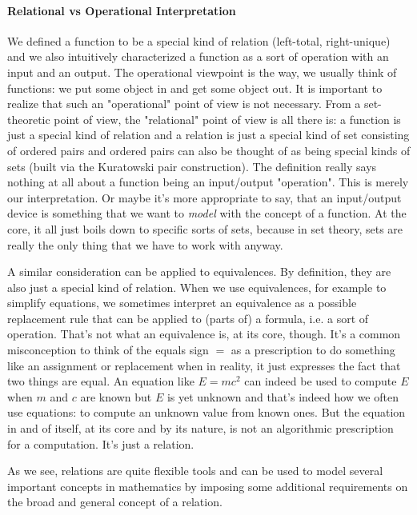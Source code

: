 \paragraph{Relational vs Operational Interpretation}
We defined a function to be a special kind of relation (left-total, right-unique) and we also intuitively characterized a function as a sort of operation with an input and an output. The operational viewpoint is the way, we usually think of functions: we put some object in and get some object out. It is important to realize that such an "operational" point of view is not necessary. From a set-theoretic point of view, the "relational" point of view is all there is: a function is just a special kind of relation and a relation is just a special kind of set consisting of ordered pairs and ordered pairs can also be thought of as being special kinds of sets (built via the Kuratowski pair construction). The definition really says nothing at all about a function being an input/output "operation". This is merely our interpretation. Or maybe it's more appropriate to say, that an input/output device is something that we want to \emph{model} with the concept of a function. At the core, it all just boils down to specific sorts of sets, because in set theory, sets are really the only thing that we have to work with anyway.

\medskip
A similar consideration can be applied to equivalences. By definition, they are also just a special kind of relation. When we use equivalences, for example to simplify equations, we sometimes interpret an equivalence as a possible replacement rule that can be applied to (parts of) a formula, i.e. a sort of operation. That's not what an equivalence is, at its core, though. It's a common misconception to think of the equals sign $=$ as a prescription to do something like an assignment or replacement when in reality, it just expresses the fact that two things are equal. An equation like $E = m c^2$ can indeed be used to compute $E$ when $m$ and $c$ are known but $E$ is yet unknown and that's indeed how we often use equations: to compute an unknown value from known ones. But the equation in and of itself, at its core and by its nature, is not an algorithmic prescription for a computation. It's just a relation.

\medskip
As we see, relations are quite flexible tools and can be used to model several important concepts in mathematics by imposing some additional requirements on the broad and general concept of a relation.

